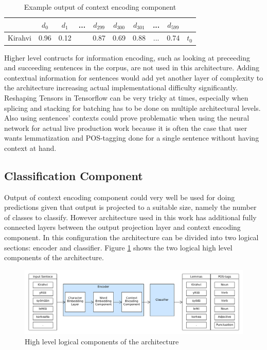 \documentclass[12pt,a4paper,english
]{tutthesis}
\begin{document}
\begin{table}[htbp]
\caption{Example output of context encoding component}
\label{table:context_encoding_component_output}
\centering
\begin{tabular}{|r|c|c|c|c|c|c|c|c|l|}
  \hline
  & $d_0$ & $d_1$ & ... & $d_{299}$ & $d_{300}$ & $d_{301}$ & ... & $d_{599}$ & \\
  \hline
  \hline
  Kirahvi & 0.96 & 0.12 & & 0.87 & 0.69 & 0.88 & ... & 0.74 & $t_0$ \\
  \hline
\end{tabular}
\end{table}

Higher level contructs for information encoding, such as looking at preceeding and succeeding sentences in the corpus, are not used in this architecture. Adding contextual information for sentences would add yet another layer of complexity to the architecture increasing actual implementational difficulty significantly. Reshaping Tensors in Tensorflow can be very tricky at times, especially when splicing and stacking for batching has to be done on multiple architectural levels. Also using sentences' contexts could prove problematic when using the neural network for actual live production work because it is often the case that user wants lemmatization and POS-tagging done for a single sentence without having context at hand.


\subsection{Classification Component}
\label{ss:classification_component}
Output of context encoding component could very well be used for doing predictions given that output is projected to a suitable size, namely the number of classes to classify. However architecture used in this work has additional fully connected layers between the output projection layer and context encoding component. In this configuration the architecture can be divided into two logical sections: encoder and classifier. Figure \ref{figure:encoder_classifier} shows the two logical high level components of the architecture.

\begin{figure}[htbp]
\caption{High level logical components of the architecture}
\label{figure:encoder_classifier}
\centering
\includegraphics[width=15cm]{encoder_classifier.png}
\end{figure}
\end{document}

